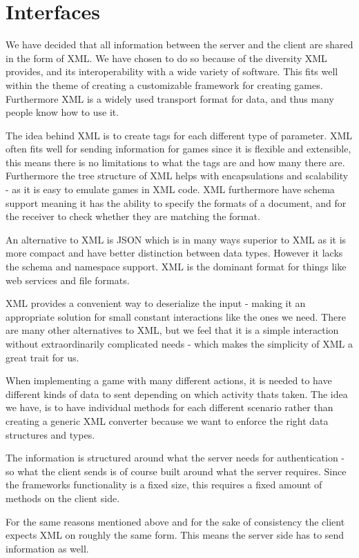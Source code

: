 \section{Interfaces}
\label{subsec:interfaces}

We have decided that all information between the server and the client are shared in the form of XML. We have chosen to do so because of the diversity XML provides, and its interoperability with a wide variety of software. This fits well within the theme of creating a customizable framework for creating games. Furthermore XML is a widely used transport format for data, and thus many people know how to use it. 

The idea behind XML is to create tags for each different type of parameter. XML often fits well for sending information for games since it is flexible and extensible, this means there is no limitations to what the tags are and how many there are. Furthermore the tree structure of XML helps with encapsulations and scalability - as it is easy to emulate games in XML code. XML furthermore have schema support meaning it has the ability to specify the formats of a document, and for the receiver to check whether they are matching the format. \cite{xml}

An alternative to XML is JSON which is in many ways superior to XML as it is more compact and have better distinction between data types. However it lacks the schema and namespace support. XML is the dominant format for things like web services and file formats.

XML provides a convenient way to deserialize the input - making it an appropriate solution for small constant interactions like the ones we need. There are many other alternatives to XML, but we feel that it is a simple interaction without extraordinarily complicated needs - which makes the simplicity of XML a great trait for us.

When implementing a game with many different actions, it is needed to have different kinds of data to sent depending on which activity thats taken. The idea we have, is to have individual methods for each different scenario rather than creating a generic XML converter because we want to enforce the right data structures and types. 

The information is structured around what the server needs for authentication - so what the client sends is of course built around what the server requires. Since the frameworks functionality is a fixed size, this requires a fixed amount of methods on the client side.

For the same reasons mentioned above and for the sake of consistency the client expects XML on roughly the same form. This means the server side has to send information as well.
